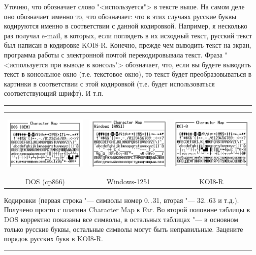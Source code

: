 Уточню, что обозначает слово "<используется"> в тексте выше. На самом деле оно обозначает именно то,
что обозначает: что в этих случаях русские буквы кодируются именно в соответствии с данной
кодировкой. Например, я несколько раз получал e-mail, в которых, если поглядеть в их исходный текст,
русский текст был написан в кодировке KOI8-R. Конечно, прежде чем выводить текст на экран,
программа работы с электронной почтой перекодировывала текст. Фраза "<используется при выводе в
консоль"> обозначает, что, если вы будете выводить текст в консольное окно (т.е. текстовое окно), то
текст будет преобразовываться в картинки в соответствии с этой кодировкой (т.е. будет 
использоваться соответствующий шрифт). И т.п.

\begin{center}
\hrule

\vspace{0.2cm}
{\footnotesize 
      
\begin{tabular}{ccc}
\includegraphics[width=5cm,height=3.128cm]{ideas/03_1_encodings/dos.png}&
\includegraphics[width=5cm,height=3.128cm]{ideas/03_1_encodings/win.png}&
\includegraphics[width=5cm,height=3.128cm]{ideas/03_1_encodings/koi.png}\\
DOS (cp866)&Windows-1251&KOI8-R
\end{tabular}

Кодировки (первая строка "--- символы номер 0.\,.31, вторая "--- 32.\,.63 и т.д.). Получено просто 
с плагина Character Map к Far. Во второй половине таблицы в DOS корректно показаны все символы, в 
остальных таблицах "--- в основном только русские буквы, остальные символы могут быть неправильные. 
Зацените порядок русских букв в KOI8-R.

}

\vspace{0.2cm}

\hrule
\end{center}

